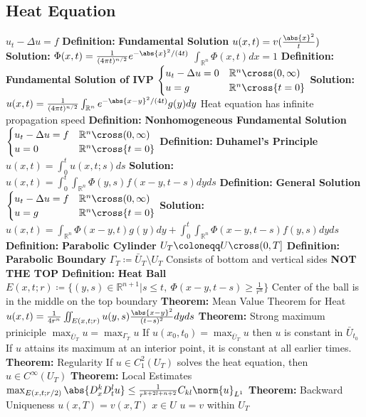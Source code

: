 \documentclass[14pt]{extarticle}
\def\Definition{{\color{blue} \textbf{Definition:} }}
\def\Theorem{{\color{red} \textbf{Theorem:} }}
\def\Solution{{\color{cyan} \textbf{Solution:} }}
\begin{document}
\begin{outline}
	\section*{Heat Equation}
		\1	$u_t - \Delta u = f$
		\1	\Definition \textbf{Fundamental Solution}
			\2	$u(x,t) = v(\frac{\abs{x}^2}{t})$
			\2	\Solution $\Phi(x,t) = \frac{1}{(4\pi t)^{n/2}}e^{-\abs{x}^2/(4t)}$
			\2	$\int_{\mathbb{R}^n} \Phi(x,t)dx = 1$
		\1	\Definition \textbf{Fundamental Solution of IVP}
			\2	$\begin{cases}
							u_t - \Delta u = 0 & \mathbb{R}^n \cross (0,\infty) \\
							u = g & \mathbb{R}^n \cross \{t=0\}
						\end{cases}$
			\2	\Solution $u(x,t) = \frac{1}{(4\pi t)^{n/2}}\int_{\mathbb{R}^n}e^{-\abs{x-y}^2/(4t)}g(y)dy$
			\2	Heat equation has infinite propagation speed
		\1	\Definition \textbf{Nonhomogeneous Fundamental Solution}
			\2	$\begin{cases}
							u_t - \Delta u = f & \mathbb{R}^n \cross (0,\infty) \\
							u = 0 & \mathbb{R}^n \cross \{t=0\}
						\end{cases}$
			\2	\Definition \textbf{Duhamel's Principle}
				\3	$u(x,t) = \int_0^t u(x,t;s)ds$
			\2	\Solution $u(x,t) = \int_0^t\int_{\mathbb{R}^n} \Phi(y,s)f(x-y,t-s)dyds$
		\1	\Definition \textbf{General Solution}
			\2	$\begin{cases}
						u_t - \Delta u = f & \mathbb{R}^n \cross (0,\infty) \\
						u = g & \mathbb{R}^n \cross \{t=0\} \\
					\end{cases}$
			\2	\Solution $u(x,t) = \int_{\mathbb{R}^n} \Phi(x-y,t)g(y)dy +
					\int_0^t\int_{\mathbb{R}^n} \Phi(x-y,t-s)f(y,s)dyds$ 
		\1	\Definition \textbf{Parabolic Cylinder}
			\2	$U_T \coloneqq U \cross (0,T]$
		\1	\Definition \textbf{Parabolic Boundary}
			\2	$\Gamma_T \coloneqq \bar{U}_T \setminus U_T$
			\2	Consists of bottom and vertical sides
			\2	\textbf{NOT THE TOP}
		\1	\Definition \textbf{Heat Ball}
			\2	$E(x,t;r) \coloneqq \{(y,s) \in \mathbb{R}^{n+1} | s \le t,~\Phi(x-y,t-s) \ge \frac{1}{r^n}\}$
			\2	Center of the ball is in the middle on the top boundary
		\1	\Theorem Mean Value Theorem for Heat
			\2	$u(x,t) = \frac{1}{4r^n}\iint_{E(x,t;r)} u(y,s) \frac{\abs{x-y}^2}{(t-s)^2}dyds$
		\1	\Theorem Strong maximum priniciple
			\2	$\max_{\bar{U}_T} u = \max_{\Gamma_T} u$
			\2	If $u(x_0,t_0) = \max_{\bar{U}_T} u$ then $u$ is constant in $\bar{U}_{t_0}$
			\2	If $u$ attains its maximum at an interior point, it is constant at all
					earlier times.  
		\1	\Theorem Regularity
			\2	If $u \in C_1^2(U_T)$ solves the heat equation, then $u \in C^{\infty}(U_T)$
		\1	\Theorem Local Estimates
			\2	$\max_{E(x,t;r/2)} \abs{D_x^kD_t^lu} \le \frac{1}{r^{k+2l+n+2}}C_{kl}\norm{u}_{L^1}$
		\1	\Theorem Backward Uniqueness
			\2	$u(x,T) = v(x,T)$ $x \in U$
			\2	$u = v$ within $U_T$
	\end{outline}
\end{document}

